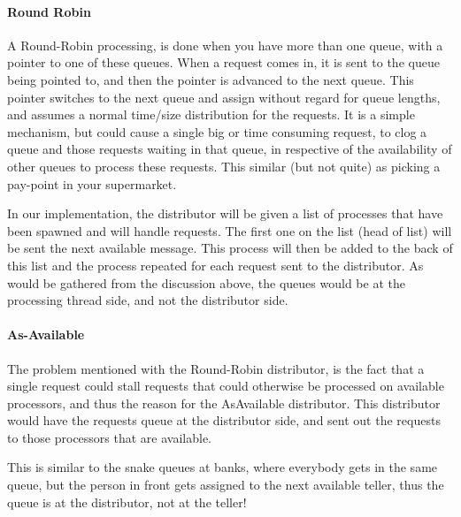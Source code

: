 \documentclass[a4paper,11pt]{report}
\begin{document}
\paragraph{Round Robin}
\label{sec:round-robin}

 A Round-Robin  processing, is done when you have more than one queue,
 with a pointer to one of these queues. When a request comes in, it is
 sent to the queue being pointed to, and then the pointer is advanced
 to the next queue. This pointer switches to the next queue
and assign without regard for queue lengths, and assumes a normal
time/size distribution for the requests. It is a simple mechanism, but
could cause a single big or time consuming request, to clog a queue
and those requests waiting in that queue, in respective of the
availability of other queues to process these requests. This similar
(but not quite) as picking a pay-point in your supermarket.

In our implementation, the distributor will be given a list of
processes that have been spawned and will handle requests. The first
one on the list (head of list) will be sent the next available
message. This process will then be added to the back of this list and
the process repeated for each request sent to the distributor. As would
be gathered from the discussion above, the queues would be at the
processing thread side, and not the distributor side.

\paragraph{As-Available}
\label{sec:as-available-1}
The problem mentioned with the Round-Robin distributor, is the fact
that a single request could stall requests that could otherwise be
processed on available processors, and thus the reason for the
AsAvailable distributor. This distributor would have the requests
queue at the distributor side, and sent out the requests to those
processors that are available.

This is similar to the snake queues at banks, where everybody gets in
the same queue, but the person in front gets assigned to the next
available teller, thus the queue is at the distributor, not at the
teller!
\end{document}
